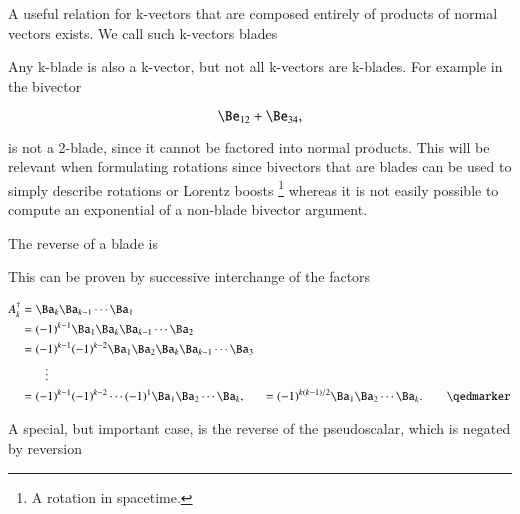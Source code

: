 %
%


A useful relation for k-vectors that are composed entirely of products of normal vectors exists.  We call such k-vectors blades


Any k-blade is also a k-vector, but not all k-vectors are k-blades.  For example in  the bivector

\begin{dmath}\label{eqn:reverse:3}
\Be_{12} + \Be_{34},
\end{dmath}

is not a 2-blade, since it cannot be factored into normal products.
This will be relevant when formulating rotations since bivectors that are blades can be used to simply describe rotations or Lorentz boosts
\footnote{A rotation in spacetime.} whereas it is not easily possible to compute an exponential of a non-blade bivector argument.

The reverse of a blade is


This can be proven by successive interchange of the factors

\begin{dmath}\label{eqn:reverse:81}
\begin{aligned}
A_k^\dagger
&= \Ba_k \Ba_{k-1} \cdots \Ba_1 \\
&= (-1)^{k-1} \Ba_1 \Ba_k \Ba_{k-1} \cdots \Ba_2 \\
&= (-1)^{k-1} (-1)^{k-2} \Ba_1 \Ba_2 \Ba_k \Ba_{k-1} \cdots \Ba_3 \\
&\qquad \vdots \\
&= (-1)^{k-1} (-1)^{k-2} \cdots (-1)^1 \Ba_1 \Ba_2 \cdots \Ba_k,
&= (-1)^{k(k-1)/2} \Ba_1 \Ba_2 \cdots \Ba_k. \qquad \qedmarker
\end{aligned}
\end{dmath}

A special, but important case, is the reverse of the  pseudoscalar, which is negated by reversion



